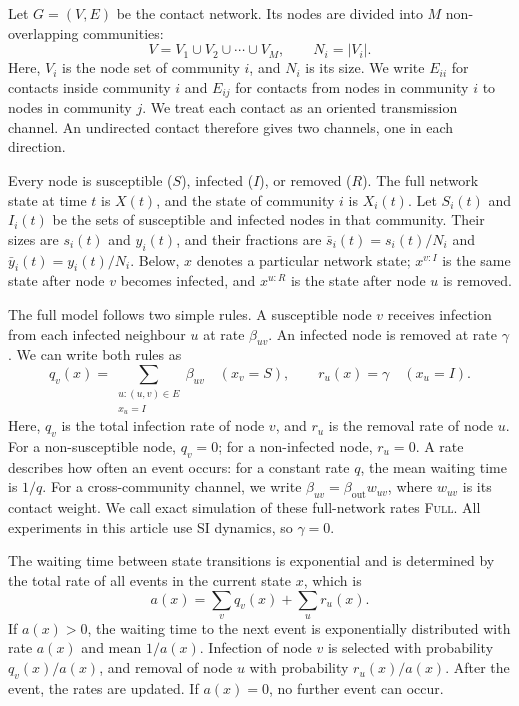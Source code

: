 \documentclass[a4paper,fleqn]{cas-sc}
\newcommand{\ibar}{\bar{y}}
\newcommand{\sbar}{\bar{s}}
\newcommand{\Full}{\textup{\textsc{Full}}}
\begin{document}
Let $G=(V,E)$ be the contact network. Its nodes are divided into $M$ non-overlapping communities:
\begin{equation}
\label{eq:partition}
V=V_1\cup V_2\cup\cdots\cup V_M,
\qquad N_i=|V_i|.
\end{equation}
Here, $V_i$ is the node set of community $i$, and $N_i$ is its size. We write $E_{ii}$ for contacts inside community $i$ and $E_{ij}$ for contacts from nodes in community $i$ to nodes in community $j$. We treat each contact as an oriented transmission channel. An undirected contact therefore gives two channels, one in each direction.

Every node is susceptible ($S$), infected ($I$), or removed ($R$). The full network state at time $t$ is $X(t)$, and the state of community $i$ is $X_i(t)$. Let $S_i(t)$ and $I_i(t)$ be the sets of susceptible and infected nodes in that community. Their sizes are $s_i(t)$ and $y_i(t)$, and their fractions are $\sbar_i(t)=s_i(t)/N_i$ and $\ibar_i(t)=y_i(t)/N_i$. Below, $x$ denotes a particular network state; $x^{v:I}$ is the same state after node $v$ becomes infected, and $x^{u:R}$ is the state after node $u$ is removed.

The full model follows two simple rules. A susceptible node $v$ receives infection from each infected neighbour $u$ at rate $\beta_{uv}$. An infected node is removed at rate $\gamma$. We can write both rules as
\begin{equation}
\label{eq:full_generator}
q_v(x)=\sum_{\substack{u:(u,v)\in E\\x_u=I}}\beta_{uv}
\quad (x_v=S),
\qquad r_u(x)=\gamma\quad (x_u=I).
\end{equation}
Here, $q_v$ is the total infection rate of node $v$, and $r_u$ is the removal rate of node $u$. For a non-susceptible node, $q_v=0$; for a non-infected node, $r_u=0$. A rate describes how often an event occurs: for a constant rate $q$, the mean waiting time is $1/q$. For a cross-community channel, we write $\beta_{uv}=\beta_{\mathrm{out}}w_{uv}$, where $w_{uv}$ is its contact weight. We call exact simulation of these full-network rates \Full{}. All experiments in this article use SI dynamics, so $\gamma=0$.

The waiting time between state transitions is exponential and is determined by the total rate of all events in the current state $x$, which is
\[
a(x)=\sum_v q_v(x)+\sum_u r_u(x).
\]
If $a(x)>0$, the waiting time to the next event is exponentially distributed with rate $a(x)$ and mean $1/a(x)$. Infection of node $v$ is selected with probability $q_v(x)/a(x)$, and removal of node $u$ with probability $r_u(x)/a(x)$. After the event, the rates are updated. If $a(x)=0$, no further event can occur.
\end{document}
